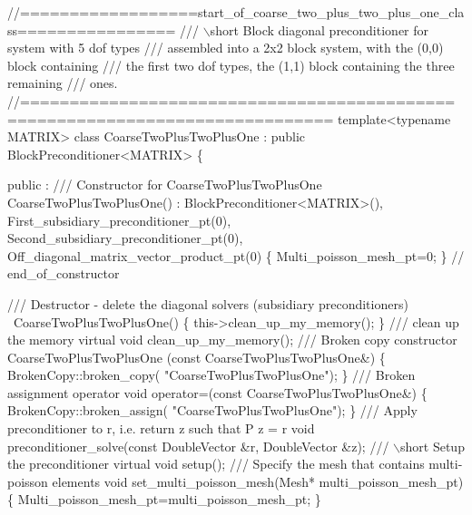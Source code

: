 \begin{DoxyCodeInclude}
\textcolor{comment}{//==================start\_of\_coarse\_two\_plus\_two\_plus\_one\_class================}\textcolor{comment}{}
\textcolor{comment}{/// \(\backslash\)short Block diagonal preconditioner for system with 5 dof types}
\textcolor{comment}{/// assembled into a 2x2 block system, with the (0,0) block containing}
\textcolor{comment}{/// the first two dof types, the (1,1) block containing the three remaining }
\textcolor{comment}{/// ones.}
\textcolor{comment}{}\textcolor{comment}{//=============================================================================}
 \textcolor{keyword}{template}<\textcolor{keyword}{typename} MATRIX> 
 \textcolor{keyword}{class }CoarseTwoPlusTwoPlusOne : 
  \textcolor{keyword}{public} BlockPreconditioner<MATRIX>
 \{
  
 public :
  \textcolor{comment}{}
\textcolor{comment}{  /// Constructor for CoarseTwoPlusTwoPlusOne}
\textcolor{comment}{}   CoarseTwoPlusTwoPlusOne() : 
  BlockPreconditioner<MATRIX>(),
   First\_subsidiary\_preconditioner\_pt(0),
   Second\_subsidiary\_preconditioner\_pt(0),
   Off\_diagonal\_matrix\_vector\_product\_pt(0)
    \{    
     Multi\_poisson\_mesh\_pt=0;
    \} \textcolor{comment}{// end\_of\_constructor}
  
  \textcolor{comment}{}
\textcolor{comment}{  /// Destructor - delete the diagonal solvers (subsidiary preconditioners)}
\textcolor{comment}{}  ~CoarseTwoPlusTwoPlusOne()
   \{
    this->clean\_up\_my\_memory();
   \}    
  \textcolor{comment}{}
\textcolor{comment}{  /// clean up the memory}
\textcolor{comment}{}  \textcolor{keyword}{virtual} \textcolor{keywordtype}{void} clean\_up\_my\_memory();
\textcolor{comment}{}
\textcolor{comment}{  /// Broken copy constructor}
\textcolor{comment}{}  CoarseTwoPlusTwoPlusOne
  (\textcolor{keyword}{const} CoarseTwoPlusTwoPlusOne&) 
   \{ 
    BrokenCopy::broken\_copy(
     \textcolor{stringliteral}{"CoarseTwoPlusTwoPlusOne"});
   \} 
  \textcolor{comment}{}
\textcolor{comment}{  /// Broken assignment operator}
\textcolor{comment}{}  \textcolor{keywordtype}{void} operator=(\textcolor{keyword}{const} 
                 CoarseTwoPlusTwoPlusOne&) 
   \{
    BrokenCopy::broken\_assign(
     \textcolor{stringliteral}{"CoarseTwoPlusTwoPlusOne"});
   \}
  \textcolor{comment}{}
\textcolor{comment}{  /// Apply preconditioner to r, i.e. return z such that P z = r}
\textcolor{comment}{}  \textcolor{keywordtype}{void} preconditioner\_solve(\textcolor{keyword}{const} DoubleVector &r, DoubleVector &z);
  \textcolor{comment}{}
\textcolor{comment}{  /// \(\backslash\)short Setup the preconditioner }
\textcolor{comment}{}  \textcolor{keyword}{virtual} \textcolor{keywordtype}{void} setup();
 \textcolor{comment}{}
\textcolor{comment}{  /// Specify the mesh that contains multi-poisson elements}
\textcolor{comment}{}  \textcolor{keywordtype}{void} set\_multi\_poisson\_mesh(Mesh* multi\_poisson\_mesh\_pt)
  \{
   Multi\_poisson\_mesh\_pt=multi\_poisson\_mesh\_pt;
  \}


\end{DoxyCodeInclude}
